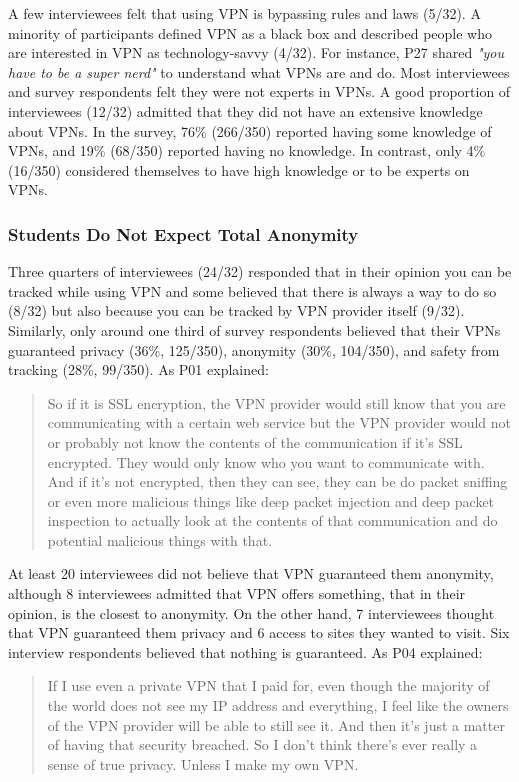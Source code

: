A few interviewees felt that using VPN is
bypassing rules and laws (5/32). A minority of participants defined VPN as a black box and described people who are
interested in VPN as technology-savvy (4/32). For instance, P27 shared \textit{"you have to be a super nerd"} to understand what VPNs are and do. Most interviewees and survey respondents felt they were not experts in VPNs. A good proportion of interviewees (12/32) admitted that they did not have an extensive knowledge
about VPNs. In the survey, 76\% (266/350) reported having some knowledge of
VPNs, and 19\% (68/350) reported having no knowledge. In contrast, only 4\%
(16/350) considered themselves to have high knowledge or to be experts on
VPNs.

\subsubsection{Students Do Not Expect Total Anonymity} 
Three quarters of interviewees (24/32) responded that in their opinion you can be tracked
while using VPN and some believed that there is always a way to do so
(8/32) but also because you can be tracked by VPN provider itself (9/32). Similarly, only around one third of survey respondents believed that their VPNs guaranteed privacy (36\%,
125/350), anonymity (30\%, 104/350), and safety from tracking (28\%, 99/350). As P01 explained:

\begin{quote}So if it is SSL encryption, the VPN provider would still know
that you are communicating with a certain web service but the VPN provider
would not or probably not know the contents of the communication if it's SSL
encrypted. They would only know who you want to communicate with. And if it's
not encrypted, then they can see, they can be do packet sniffing or even more
malicious things like deep packet injection and deep packet inspection to
actually look at the contents of that communication and do potential malicious
things with that. \end{quote}

At least 20 interviewees did not
believe that VPN guaranteed them anonymity, although 8 interviewees admitted
that VPN offers something, that in their opinion, is the closest to anonymity.
On the other hand, 7 interviewees thought that VPN guaranteed them privacy and
6 access to sites they wanted to visit. Six interview respondents believed
that nothing is guaranteed. As P04 explained: \begin{quote}If I use even a private VPN that I paid for, even
though the majority of the world does not see my IP address and everything, I
feel like the owners of the VPN provider will be able to still see it. And
then it's just a matter of having that security breached. So I don't think
there's ever really a sense of true privacy. Unless I make my own
VPN.\end{quote}



